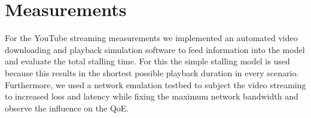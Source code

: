 \section{Measurements}
\label{c3:measurements}



For the YouTube streaming measurements we implemented an automated video downloading and playback simulation software to feed information into the model and evaluate the total stalling time. For this the simple stalling model is used because this results in the shortest possible playback duration in every scenario. Furthermore, we used a network emulation testbed to subject the video streaming to increased loss and latency while fixing the maximum network bandwidth and observe the influence on the QoE.


